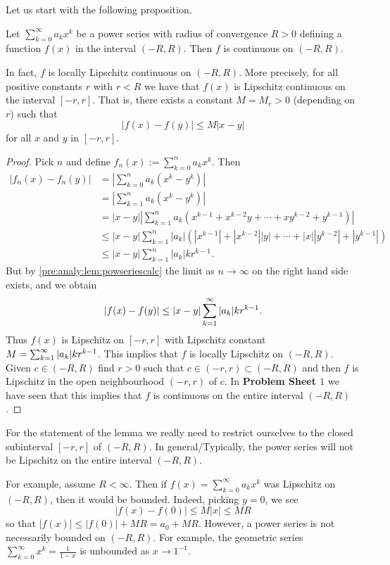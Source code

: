 \documentclass[10pt, a4paper]{article}
\newcommand{\infsumo}[1][k = 0]{\sum_{#1}^{\infty}}
\begin{document}
Let us start with the following proposition.
\begin{proposition}\label{pre:analy:prop:powserarecont}
    Let $\infsumo a_kx ^ k$ be a power series with radius of convergence $R > 0$ defining a function $f(x)$ in the interval $(-R, R)$.
    Then $f$ is continuous on $(-R, R)$.

    In fact,
    $f$ is locally Lipschitz continuous on $(-R, R)$.
    More precisely,
    for all positive constants $r$ with $r < R$ we have that $f(x)$ is Lipschitz continuous on the interval $[-r, r]$.
    That is,
    there exists a constant $M = M_r > 0$
    (depending on $r$)
    such that
    \[
    |f(x) - f(y)| \leq M|x - y|
    \]
    for all $x$ and $y$ in $[-r, r]$.
    \begin{proof}
        Pick $n$ and define $f_n(x) := \sum_{k = 0}^{n}a_kx ^ k$.
        Then
        \begin{align*}
            |f_n(x) - f_n(y)| &= \left|\sum_{k = 0}^{n}a_k(x ^ k - y ^ k)\right| \\
            &= \left|\sum_{k = 1}^{n}a_k(x ^ k - y ^ k)\right| \\
            &= |x - y|\left|\sum_{k = 1}^{n}a_k\left(x ^ {k - 1} + x ^ {k - 2}y + \dotsi + xy ^ {k - 2} + y ^ {k - 1}\right)\right| \\
            &\leq |x - y|\sum_{k = 1}^{n}|a_k|\left(|x ^ {k - 1}| + |x ^ {k - 2}||y| + \dotsi + |x||y ^ {k - 2}| + |y ^ {k - 1}|\right) \\
            &\leq |x - y|\sum_{k = 1}^{n}|a_k|kr ^ {k - 1}.
        \end{align*}
        But by \autoref{pre:analy:lem:powseriescalc} the limit as $n \rightarrow \infty$ on the right hand side exists,
        and we obtain
        \[
        |f(x) - f(y)| \leq |x - y|\sum_{k = 1}^{\infty}|a_k|kr ^ {k - 1}.
        \]
        Thus $f(x)$ is Lipschitz on $[-r, r]$ with Lipschitz constant $M = \sum_{k = 1}^{\infty}|a_k|kr ^ {k - 1}$.
        This implies that $f$ is locally Lipschitz on $(-R, R)$.
        Given $c \in (-R, R)$ find $r > 0$ such that $c \in (-r, r) \subset (-R, R)$ and then $f$ is Lipschitz in the open neighbourhood $(-r, r)$ of $c$.
        In \textbf{Problem Sheet $1$} we have seen that this implies that $f$ is continuous on the entire interval $(-R, R)$.
    \end{proof}
\end{proposition}

\begin{remark}
    For the statement of the lemma we really need to restrict ourselves to the closed subinterval $[-r, r]$ of $(-R, R)$.
    In general/Typically,
    the power series will not be Lipschitz on the entire interval $(-R, R)$.
    
    For example,
    assume $R < \infty$.
    Then if $f(x) = \infsumo a_kx ^ k$ was Lipschitz on $(-R, R)$,
    then it would be bounded.
    Indeed,
    picking $y = 0$,
    we see
    \[
    |f(x) - f(0)| \leq M|x| \leq MR
    \]
    so that $|f(x)| \leq |f(0)| + MR = a_0 + MR$.
    However,
    a power series is not necessarily bounded on $(-R, R)$.
    For example,
    the geometric series $\infsumo x ^ k = \frac{1}{1 - x}$ is unbounded as $x \rightarrow 1 ^ {-1}$.
\end{remark}
\end{document}
